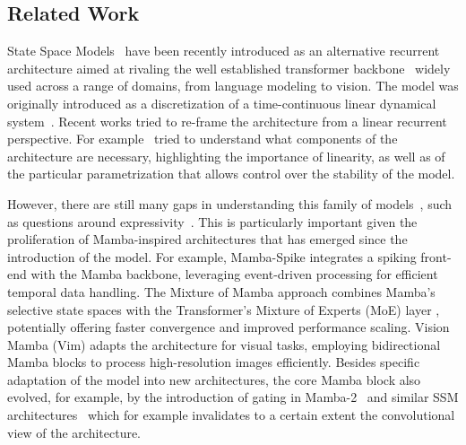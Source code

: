 \subsection{Related Work}

State Space Models~\cite{gu2020hippo, gu2021combining} have been recently introduced as an alternative recurrent architecture aimed at rivaling the well established transformer backbone~\cite{vaswani2017attention} widely used across a range of domains, from language modeling to vision. The model was originally introduced as a discretization of a time-continuous linear dynamical system~\cite{gu2021combining}. Recent works tried to re-frame the architecture from a linear recurrent perspective. For example~\cite{orvieto2023resurrecting} tried to understand what components of the architecture are necessary, highlighting the importance of linearity, as well as of the particular parametrization that allows control over the stability of the model.

However, there are still many gaps in understanding this family of models~\cite{team2024jamba}, such as questions around expressivity~\cite{orvieto2023universality}. This is particularly important given the proliferation of Mamba-inspired architectures that has emerged since the introduction of the model. 
For example, Mamba-Spike \cite{qin2024mamba} integrates a spiking front-end with the Mamba backbone, leveraging event-driven processing for efficient temporal data handling. The Mixture of Mamba approach combines Mamba's selective state spaces with the Transformer's Mixture of Experts (MoE) layer \cite{csordas2024moeut}, potentially offering faster convergence and improved performance scaling. Vision Mamba (Vim) \cite{zhu2401vision} adapts the architecture for visual tasks, employing bidirectional Mamba blocks to process high-resolution images efficiently. Besides specific adaptation of the model into new architectures, the core Mamba block also evolved, for example, by the introduction of gating in Mamba-2~\cite{mamba2023gu} and similar SSM architectures~\cite{de2024griffin,Beck2024xLSTM} which for example invalidates to a certain extent the convolutional view of the architecture. 

